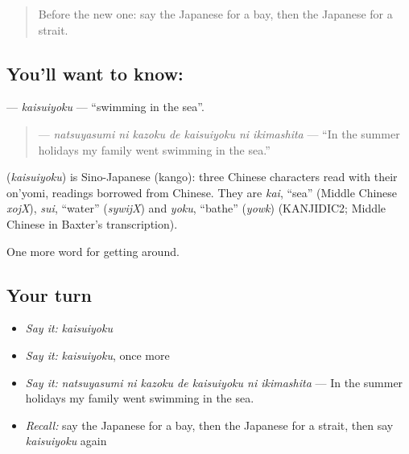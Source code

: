 \begin{quote}
Before the new one: say the Japanese for a bay, then the Japanese for a strait.
\end{quote}

\subsection*{You'll want to know: }
\textbf{} — \emph{kaisuiyoku} — \textquotedblleft{}swimming in the sea\textquotedblright{}.

\begin{quote}
\textbf{   } — \emph{natsuyasumi ni kazoku de kaisuiyoku ni ikimashita} — \textquotedblleft{}In the summer holidays my family went swimming in the sea.\textquotedblright{}
\end{quote}

\begin{cousinweb}
\textbf{} (\emph{kaisuiyoku}) is Sino-Japanese (kango): three Chinese characters read with their on'yomi, readings borrowed from Chinese. They are \emph{kai}, \textquotedblleft{}sea\textquotedblright{} (Middle Chinese \emph{xojX}), \emph{sui}, \textquotedblleft{}water\textquotedblright{} (\emph{sywijX}) and \emph{yoku}, \textquotedblleft{}bathe\textquotedblright{} (\emph{yowk}) (KANJIDIC2; Middle Chinese in Baxter's transcription).
\end{cousinweb}

\begin{grammarlens}[title={What you've built}]
One more word for getting around.
\end{grammarlens}

\subsection*{Your turn}
\begin{itemize}
\raggedright
  \item \emph{Say it:} \emph{kaisuiyoku}
  \item \emph{Say it:} \emph{kaisuiyoku}, once more
  \item \emph{Say it:} \emph{natsuyasumi ni kazoku de kaisuiyoku ni ikimashita} — In the summer holidays my family went swimming in the sea.
  \item \emph{Recall:} say the Japanese for a bay, then the Japanese for a strait, then say \emph{kaisuiyoku} again
\end{itemize}

